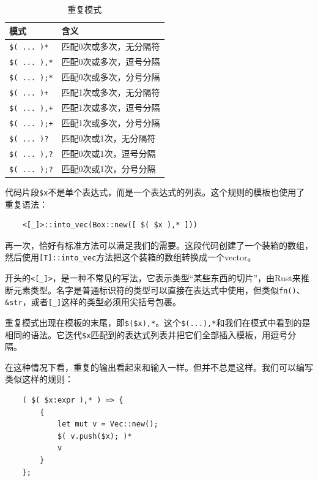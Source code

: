 \begin{table}[htbp]
    \centering
    \caption{重复模式}
    \label{t21-1}
    \begin{tabular}{ll}
        \hline
        \textbf{模式} & \textbf{含义} \\
        \hline
        \texttt{\$( ... )*}     & 匹配0次或多次，无分隔符   \\
        \rowcolor{tablecolor}
        \texttt{\$( ... ),*}    & 匹配0次或多次，逗号分隔   \\
        \texttt{\$( ... );*}    & 匹配0次或多次，分号分隔   \\
        \rowcolor{tablecolor}
        \texttt{\$( ... )+}     & 匹配1次或多次，无分隔符   \\
        \texttt{\$( ... ),+}    & 匹配1次或多次，逗号分隔   \\
        \rowcolor{tablecolor}
        \texttt{\$( ... );+}    & 匹配1次或多次，分号分隔   \\
        \texttt{\$( ... )?}     & 匹配0次或1次，无分隔符    \\
        \rowcolor{tablecolor}
        \texttt{\$( ... ),?}    & 匹配0次或1次，逗号分隔    \\
        \texttt{\$( ... );?}    & 匹配0次或1次，分号分隔    \\
    \end{tabular}
\end{table}

代码片段\texttt{\$x}不是单个表达式，而是一个表达式的列表。这个规则的模板也使用了重复语法：
\begin{verbatim}
    <[_]>::into_vec(Box::new([ $( $x ),* ]))
\end{verbatim}

再一次，恰好有标准方法可以满足我们的需要。这段代码创建了一个装箱的数组，然后使用\texttt{[T]::into\_vec}方法把这个装箱的数组转换成一个vector。

开头的\texttt{<[\_]>}，是一种不常见的写法，它表示类型“某些东西的切片”，由Rust来推断元素类型。名字是普通标识符的类型可以直接在表达式中使用，但类似\texttt{fn()}、\texttt{\&str}，或者\texttt{[\_]}这样的类型必须用尖括号包裹。

重复模式出现在模板的末尾，即\texttt{\$(\$x),*}。这个\texttt{\$(...),*}和我们在模式中看到的是相同的语法。它迭代\texttt{\$x}匹配到的表达式列表并把它们全部插入模板，用逗号分隔。

在这种情况下看，重复的输出看起来和输入一样。但并不总是这样。我们可以编写类似这样的规则：
\begin{verbatim}
    ( $( $x:expr ),* ) => {
        {
            let mut v = Vec::new();
            $( v.push($x); )*
            v
        }
    };
\end{verbatim}

